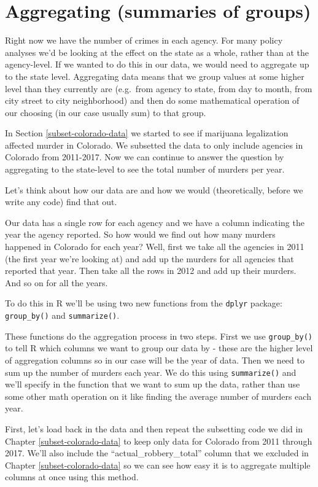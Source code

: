 \documentclass[
]{krantz}
\begin{document}
\hypertarget{aggregate}{%
\section{Aggregating (summaries of groups)}\label{aggregate}}

Right now we have the number of crimes in each agency. For many policy analyses we'd be looking at the effect on the state as a whole, rather than at the agency-level. If we wanted to do this in our data, we would need to aggregate up to the state level. Aggregating data means that we group values at some higher level than they currently are (e.g.~from agency to state, from day to month, from city street to city neighborhood) and then do some mathematical operation of our choosing (in our case usually sum) to that group.

In Section \ref{subset-colorado-data} we started to see if marijuana legalization affected murder in Colorado. We subsetted the data to only include agencies in Colorado from 2011-2017. Now we can continue to answer the question by aggregating to the state-level to see the total number of murders per year.

Let's think about how our data are and how we would (theoretically, before we write any code) find that out.

Our data has a single row for each agency and we have a column indicating the year the agency reported. So how would we find out how many murders happened in Colorado for each year? Well, first we take all the agencies in 2011 (the first year we're looking at) and add up the murders for all agencies that reported that year. Then take all the rows in 2012 and add up their murders. And so on for all the years.

To do this in R we'll be using two new functions from the \texttt{dplyr} package: \texttt{group\_by()} and \texttt{summarize()}.

These functions do the aggregation process in two steps. First we use \texttt{group\_by()} to tell R which columns we want to group our data by - these are the higher level of aggregation columns so in our case will be the year of data. Then we need to sum up the number of murders each year. We do this using \texttt{summarize()} and we'll specify in the function that we want to sum up the data, rather than use some other math operation on it like finding the average number of murders each year.

First, let's load back in the data and then repeat the subsetting code we did in Chapter \ref{subset-colorado-data} to keep only data for Colorado from 2011 through 2017. We'll also include the ``actual\_robbery\_total'' column that we excluded in Chapter \ref{subset-colorado-data} so we can see how easy it is to aggregate multiple columns at once using this method.
\end{document}
